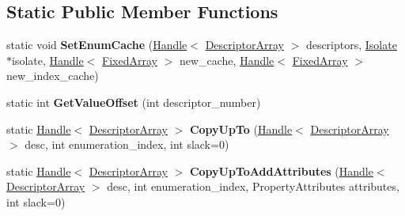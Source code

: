 \subsection*{Static Public Member Functions}
\begin{DoxyCompactItemize}
\item 
static void {\bfseries Set\+Enum\+Cache} (\hyperlink{classv8_1_1internal_1_1_handle}{Handle}$<$ \hyperlink{classv8_1_1internal_1_1_descriptor_array}{Descriptor\+Array} $>$ descriptors, \hyperlink{classv8_1_1internal_1_1_isolate}{Isolate} $\ast$isolate, \hyperlink{classv8_1_1internal_1_1_handle}{Handle}$<$ \hyperlink{classv8_1_1internal_1_1_fixed_array}{Fixed\+Array} $>$ new\+\_\+cache, \hyperlink{classv8_1_1internal_1_1_handle}{Handle}$<$ \hyperlink{classv8_1_1internal_1_1_fixed_array}{Fixed\+Array} $>$ new\+\_\+index\+\_\+cache)\hypertarget{classv8_1_1internal_1_1_descriptor_array_a3f25cb9d6161aa0c2b3fc2796683b151}{}\label{classv8_1_1internal_1_1_descriptor_array_a3f25cb9d6161aa0c2b3fc2796683b151}

\item 
static int {\bfseries Get\+Value\+Offset} (int descriptor\+\_\+number)\hypertarget{classv8_1_1internal_1_1_descriptor_array_a876b8f24ff519e21c86f03ddcc5ef6e7}{}\label{classv8_1_1internal_1_1_descriptor_array_a876b8f24ff519e21c86f03ddcc5ef6e7}

\item 
static \hyperlink{classv8_1_1internal_1_1_handle}{Handle}$<$ \hyperlink{classv8_1_1internal_1_1_descriptor_array}{Descriptor\+Array} $>$ {\bfseries Copy\+Up\+To} (\hyperlink{classv8_1_1internal_1_1_handle}{Handle}$<$ \hyperlink{classv8_1_1internal_1_1_descriptor_array}{Descriptor\+Array} $>$ desc, int enumeration\+\_\+index, int slack=0)\hypertarget{classv8_1_1internal_1_1_descriptor_array_a3dbea7e3516fe8d5f48f68b33c265111}{}\label{classv8_1_1internal_1_1_descriptor_array_a3dbea7e3516fe8d5f48f68b33c265111}

\item 
static \hyperlink{classv8_1_1internal_1_1_handle}{Handle}$<$ \hyperlink{classv8_1_1internal_1_1_descriptor_array}{Descriptor\+Array} $>$ {\bfseries Copy\+Up\+To\+Add\+Attributes} (\hyperlink{classv8_1_1internal_1_1_handle}{Handle}$<$ \hyperlink{classv8_1_1internal_1_1_descriptor_array}{Descriptor\+Array} $>$ desc, int enumeration\+\_\+index, Property\+Attributes attributes, int slack=0)\hypertarget{classv8_1_1internal_1_1_descriptor_array_ac84a052a1341d4c0ece48bfc166379c7}{}\label{classv8_1_1internal_1_1_descriptor_array_ac84a052a1341d4c0ece48bfc166379c7}


\end{DoxyCompactItemize}
